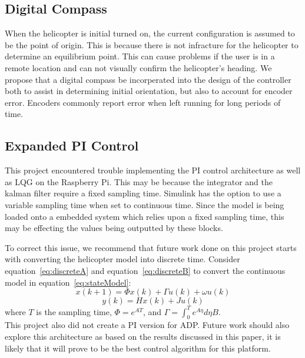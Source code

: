 \subsection{Digital Compass}
When the helicopter is initial turned on, the current configuration is assumed to be the point of origin.  This is because there is not infracture for the helicopter to determine an equilibrium point.  This can cause problems if the user is in a remote location and can not visually confirm the helicopter's heading.  We propose that a digital compass be incorperated into the design of the controller both to assist in determining initial orientation, but also to account for encoder error.  Encoders commonly report error when left running for long periods of time.

\subsection{Expanded PI Control}
This project encountered trouble implementing the PI control architecture as well as LQG on the Raspberry Pi. This may be because the integrator and the kalman filter require a fixed sampling time.  Simulink has the option to use a variable sampling time when set to continuous time.  Since the model is being loaded onto a embedded system which relies upon a fixed sampling time, this may be effecting the values being outputted by these blocks.

To correct this issue, we recommend that future work done on this project starts with converting the helicopter model into discrete time.  Consider equation~\ref{eq:discreteA} and equation~\ref{eq:discreteB} to convert the continuous model in equation~\ref{eq:stateModel}:
\begin{equation}
\label{eq:discreteA}
    x(k+1)=\Phi x(k)+\Gamma u(k)+\omega u(k)
\end{equation}
\begin{equation}
\label{eq:discreteB}
    y(k)=Hx(k)+Ju(k)
\end{equation}
where $T$ is the sampling time, $\Phi=e^{AT}$, and $\Gamma=\int_0^T e^{A\eta} d\eta B$.\\
This project also did not create a PI version for ADP.  Future work should also explore this architecture as based on the results discussed in this paper, it is likely that it will prove to be the best control algorithm for this platform.




